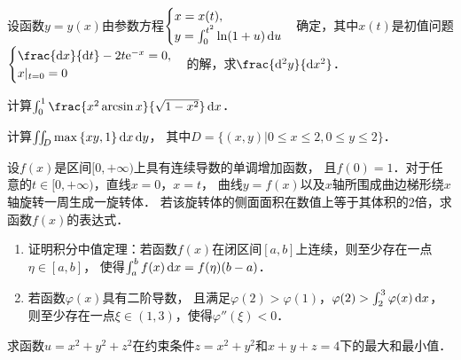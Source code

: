 \documentclass[plain,noanswer,medmath]{../../template/jnuexam}
\begin{document}




\begin{problem}[points=10]
设函数$y = y(x)$由参数方程$\begin{cases}
  x = x(t), \\
  y = \int_0^{t^2} \ln(1 + u)\mathop{}\!\mathrm{d} u
\end{cases}$确定，其中$x(t)$是初值问题$\begin{cases}
  \frac{\dx}{\dt} - 2t\e^{- x} = 0, \\
  x|_{t = 0} = 0
\end{cases}$的解，求$\frac{\d^2y}{\dx^2}$．
\end{problem}


\begin{problem}[points=9]
计算$\int_0^1 \frac{x^2\arcsin x}{\sqrt{1 - x^2}} \dx$．
\end{problem}


\begin{problem}[points=11]
计算$\iint_D \max \left\{xy,1 \right\} \mathop{}\!\mathrm{d} x\mathop{}\!\mathrm{d} y$，
其中$D = \{\left. (x,y) \right|0 \le x \le 2,0 \le y \le 2\}$．
\end{problem}


\begin{problem}[points=11]
设$f(x)$是区间$[0, +\infty)$上具有连续导数的单调增加函数，
且$f(0) = 1$．对于任意的$t \in[0, +\infty)$，直线$x = 0$，$x = t$，
曲线$y = f(x)$以及$x$轴所围成曲边梯形绕$x$轴旋转一周生成一旋转体．
若该旋转体的侧面面积在数值上等于其体积的$2$倍，求函数$f(x)$的表达式．
\end{problem}


\begin{problem}[points=11]
\begin{enumerate}
\item 证明积分中值定理：若函数$f(x)$在闭区间$[a,b]$上连续，则至少存在一点$\eta\in[a,b]$，
      使得$\int_a^b f(x)\mathop{}\!\mathrm{d} x = f(\eta)(b - a)$．
\item 若函数$\varphi (x)$具有二阶导数，
      且满足$\varphi(2) > \varphi(1)$，$\varphi(2) > \int_2^3\varphi(x)\mathop{}\!\mathrm{d} x$，
      则至少存在一点$\xi \in(1,3)$，$\text{使得}\varphi''(\xi) < 0$．
\end{enumerate}
\end{problem}


\begin{problem}[points=11]
求函数$u = x^2 + y^2 + z^2$在约束条件$z = x^2 + y^2$和$x + y + z = 4$下的最大和最\goodbreak 小值．
\end{problem}
\end{document}
